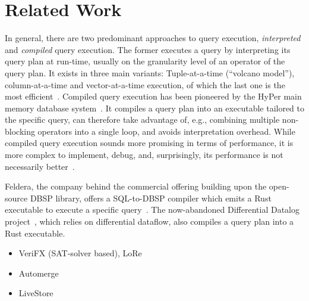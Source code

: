 \section{Related Work}\label{sec:related-work}

In general, there are two predominant approaches to query execution,
\emph{interpreted} and \emph{compiled} query execution.
The former executes a query by interpreting its query plan at run-time,
usually on the granularity level of an operator of the query plan.
It exists in three main variants: Tuple-at-a-time (``volcano model''),
column-at-a-time and vector-at-a-time execution,
of which the last one is the most efficient~\cite{zukowski2005monetdb}.
Compiled query execution has been pioneered by the HyPer main memory database
system~\cite{neumann2011efficiently}.
It compiles a query plan into an executable tailored to the specific query,
can therefore take advantage of, e.g., combining multiple non-blocking operators
into a single loop, and avoids interpretation overhead.
While compiled query execution sounds more promising in terms of performance,
it is more complex to implement, debug, and, surprisingly, its performance
is not necessarily better~\cite{kersten2018everything}.

Feldera, the company behind the commercial offering building upon the
open-source DBSP library, offers a SQL-to-DBSP compiler which emits
a Rust executable to execute a specific query~\cite{feldera}.
The now-abandoned Differential Datalog project~\cite{ddlog}, which relies on
differential dataflow, also compiles a query plan into a Rust executable.

\begin{itemize}
	\item VeriFX (SAT-solver based), LoRe
	\item Automerge
	\item LiveStore
\end{itemize}
